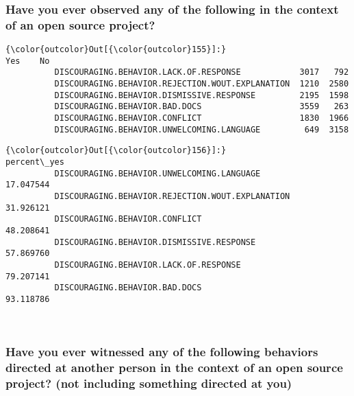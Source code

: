 \documentclass[11pt]{article}
\begin{document}
    \subsubsection{Have you ever observed any of the following in the
context of an open source
project?}\label{have-you-ever-observed-any-of-the-following-in-the-context-of-an-open-source-project}


            \begin{Verbatim}[commandchars=\\\{\}]
{\color{outcolor}Out[{\color{outcolor}155}]:}                                                    Yes    No
          DISCOURAGING.BEHAVIOR.LACK.OF.RESPONSE            3017   792
          DISCOURAGING.BEHAVIOR.REJECTION.WOUT.EXPLANATION  1210  2580
          DISCOURAGING.BEHAVIOR.DISMISSIVE.RESPONSE         2195  1598
          DISCOURAGING.BEHAVIOR.BAD.DOCS                    3559   263
          DISCOURAGING.BEHAVIOR.CONFLICT                    1830  1966
          DISCOURAGING.BEHAVIOR.UNWELCOMING.LANGUAGE         649  3158
\end{Verbatim}
        

            \begin{Verbatim}[commandchars=\\\{\}]
{\color{outcolor}Out[{\color{outcolor}156}]:}                                                   percent\_yes
          DISCOURAGING.BEHAVIOR.UNWELCOMING.LANGUAGE          17.047544
          DISCOURAGING.BEHAVIOR.REJECTION.WOUT.EXPLANATION    31.926121
          DISCOURAGING.BEHAVIOR.CONFLICT                      48.208641
          DISCOURAGING.BEHAVIOR.DISMISSIVE.RESPONSE           57.869760
          DISCOURAGING.BEHAVIOR.LACK.OF.RESPONSE              79.207141
          DISCOURAGING.BEHAVIOR.BAD.DOCS                      93.118786
\end{Verbatim}
        

    \begin{center}
    \end{center}
    { \hspace*{\fill} \\}
    

    \subsubsection{Have you ever witnessed any of the following behaviors
directed at another person in the context of an open source project?
(not including something directed at
you)}\label{have-you-ever-witnessed-any-of-the-following-behaviors-directed-at-another-person-in-the-context-of-an-open-source-project-not-including-something-directed-at-you}
\end{document}
